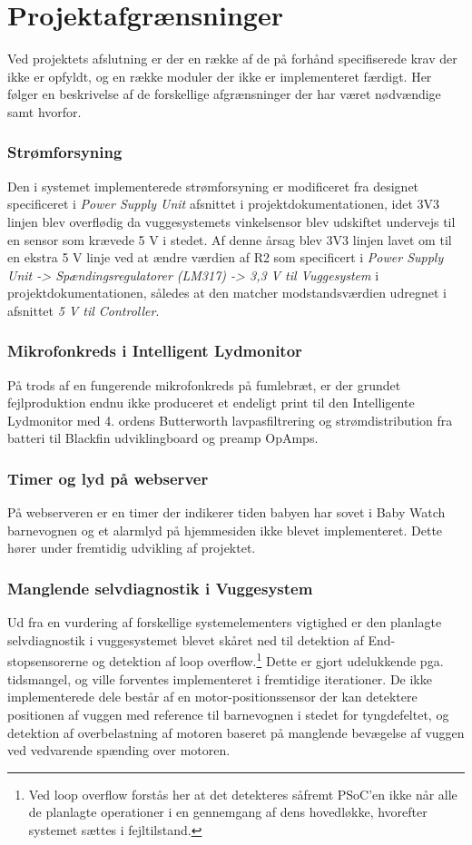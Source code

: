 %
\chapter{Projektafgrænsninger}
\label{projektafgraensninger}
Ved projektets afslutning er der en række af de på forhånd specifiserede krav der ikke er opfyldt, og en række moduler der ikke er implementeret færdigt. Her følger en beskrivelse af de forskellige afgrænsninger der har været nødvændige samt hvorfor. 

\subsection{Strømforsyning}
Den i systemet implementerede strømforsyning er modificeret fra designet specificeret i \textit{Power Supply Unit} afsnittet i projektdokumentationen, idet 3V3 linjen blev overflødig da vuggesystemets vinkelsensor blev udskiftet undervejs til en sensor som krævede 5 V i stedet. Af denne årsag blev 3V3 linjen lavet om til en ekstra 5 V linje ved at ændre værdien af R2 som specificert i \textit{Power Supply Unit -> Spændingsregulatorer (LM317) -> 3,3 V til Vuggesystem} i projektdokumentationen, således at den matcher modstandsværdien udregnet i afsnittet \textit{5 V til Controller}.

\subsection{Mikrofonkreds i Intelligent Lydmonitor}
På trods af en fungerende mikrofonkreds på fumlebræt, er der grundet fejlproduktion endnu ikke produceret et endeligt print til den Intelligente Lydmonitor med 4. ordens Butterworth lavpasfiltrering og strømdistribution fra batteri til Blackfin udviklingboard og preamp OpAmps.

\subsection{Timer og lyd på webserver}
På webserveren er en timer der indikerer tiden babyen har sovet i Baby Watch barnevognen og et alarmlyd på hjemmesiden ikke blevet implementeret. Dette hører under fremtidig udvikling af projektet. 

\subsection{Manglende selvdiagnostik i Vuggesystem}
Ud fra en vurdering af forskellige systemelementers vigtighed er den planlagte selvdiagnostik i vuggesystemet blevet skåret ned til detektion af End-stopsensorerne og detektion af loop overflow.\footnote{Ved loop overflow forstås her at det detekteres såfremt PSoC'en ikke når alle de planlagte operationer i en gennemgang af dens hovedløkke, hvorefter systemet sættes i fejltilstand.} Dette er gjort udelukkende pga. tidsmangel, og ville forventes implementeret i fremtidige iterationer. De ikke implementerede dele består af en motor-positionssensor der kan detektere positionen af vuggen med reference til barnevognen i stedet for tyngdefeltet, og detektion af overbelastning af motoren baseret på manglende bevægelse af vuggen ved vedvarende spænding over motoren. 

